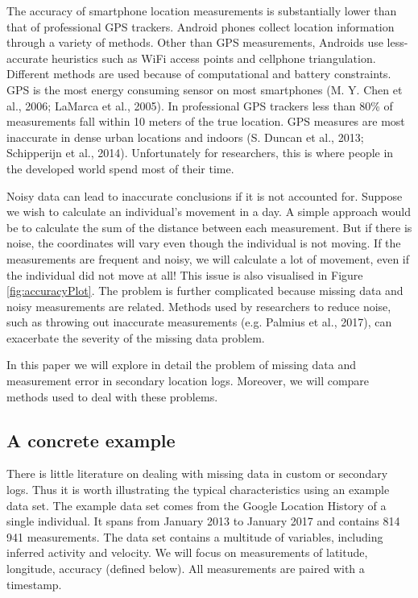 \documentclass[english,man]{apa6}
\theoremstyle{definition}
\theoremstyle{definition}
\theoremstyle{definition}
\theoremstyle{remark}
\begin{document}
The accuracy of smartphone location measurements is substantially lower
than that of professional GPS trackers. Android phones collect location
information through a variety of methods. Other than GPS measurements,
Androids use less-accurate heuristics such as WiFi access points and
cellphone triangulation. Different methods are used because of
computational and battery constraints. GPS is the most energy consuming
sensor on most smartphones (M. Y. Chen et al., 2006; LaMarca et al.,
2005). In professional GPS trackers less than 80\% of measurements fall
within 10 meters of the true location. GPS measures are most inaccurate
in dense urban locations and indoors (S. Duncan et al., 2013;
Schipperijn et al., 2014). Unfortunately for researchers, this is where
people in the developed world spend most of their time.

Noisy data can lead to inaccurate conclusions if it is not accounted
for. Suppose we wish to calculate an individual's movement in a day. A
simple approach would be to calculate the sum of the distance between
each measurement. But if there is noise, the coordinates will vary even
though the individual is not moving. If the measurements are frequent
and noisy, we will calculate a lot of movement, even if the individual
did not move at all! This issue is also visualised in Figure
\ref{fig:accuracyPlot}. The problem is further complicated because
missing data and noisy measurements are related. Methods used by
researchers to reduce noise, such as throwing out inaccurate
measurements (e.g. Palmius et al., 2017), can exacerbate the severity of
the missing data problem.

In this paper we will explore in detail the problem of missing data and
measurement error in secondary location logs. Moreover, we will compare
methods used to deal with these problems.

\subsection{A concrete example}\label{a-concrete-example}

There is little literature on dealing with missing data in custom or
secondary logs. Thus it is worth illustrating the typical
characteristics using an example data set. The example data set comes
from the Google Location History of a single individual. It spans from
January 2013 to January 2017 and contains 814 941 measurements. The data
set contains a multitude of variables, including inferred activity and
velocity. We will focus on measurements of latitude, longitude, accuracy
(defined below). All measurements are paired with a timestamp.
\end{document}
